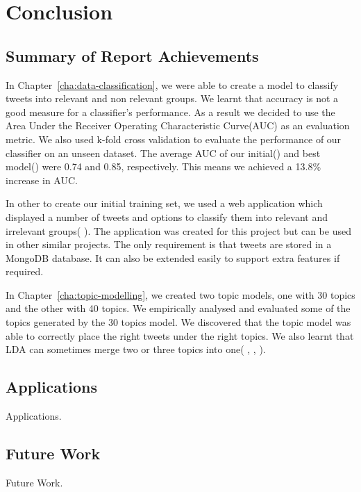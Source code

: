 
\chapter{Conclusion}
\label{ch:conclusions}

\section{Summary of Report Achievements}
In Chapter~\ref{cha:data-classification}, we were able to create a model to classify tweets into
relevant and non relevant groups. We learnt that accuracy is not a good measure for a classifier's
performance. As a result we decided to use the Area Under the Receiver Operating Characteristic
Curve(AUC) as an evaluation metric. We also used k-fold cross validation to evaluate the performance
of our classifier on an unseen dataset. The average AUC of our
initial() and best
model() were 0.74 and 0.85, respectively. This means we
achieved a 13.8\% increase in AUC.

In other to create our initial training set, we used a web application which displayed a number of
tweets and options to classify them into relevant and irrelevant groups( ). The
application was created for this project but can be used in other similar projects. The only
requirement is that tweets are stored in a MongoDB database. It can also be extended easily to
support extra features if required.

In Chapter~\ref{cha:topic-modelling}, we created two topic models, one with 30 topics and the other
with 40 topics. We empirically analysed and evaluated some of the topics generated by the 30 topics
model. We discovered that the topic model was able to correctly place the right tweets under the
right topics. We also learnt that LDA can sometimes merge two or three topics into one(
, , ).


\section{Applications}

Applications.


\section{Future Work}

Future Work.
